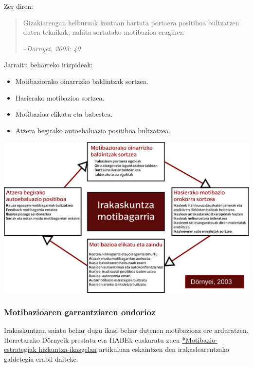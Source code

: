 \documentclass[
]{book}
\providecommand{\tightlist}{%
  \setlength{\itemsep}{0pt}\setlength{\parskip}{0pt}}
\begin{document}
Zer diren:

\begin{quote}
Gizakiarengan helburuak kontuan hartuta portaera positiboa bultzatzen duten teknikak, nahita sortutako motibazioa eraginez.

--\emph{Dörnyei, 2003: 40}
\end{quote}

Jarraitu beharreko irizpideak:

\begin{itemize}
\tightlist
\item
  Motibaziorako oinarrizko baldintzak sortzea.
\item
  Hasierako motibazioa sortzea.
\item
  Motibazioa elikatu eta babestea.
\item
  Atzera begirako autoebaluazio positiboa bultzatzea.
\end{itemize}

\includegraphics{assets/06-01_Irakaskuntza motibagarria.png}

\hypertarget{motibazioaren-garrantziaren-ondorioz}{%
\subsubsection{Motibazioaren garrantziaren ondorioz}\label{motibazioaren-garrantziaren-ondorioz}}

Irakaskuntzan saiatu behar dugu ikasi behar dutenen motibazioaz ere arduratzen. Horretarako Dörnyeik prestatu eta HABEk euskaratu zuen \href{https://b08normalkuntza.wikispaces.com/file/view/MOTIBAZIO+ESTRAT.pdf}{*Motibazio-estrategiak hizkuntza-ikasgelan} artikuluan eskaintzen den irakaslearentzako galdetegia erabil daiteke.
\end{document}
